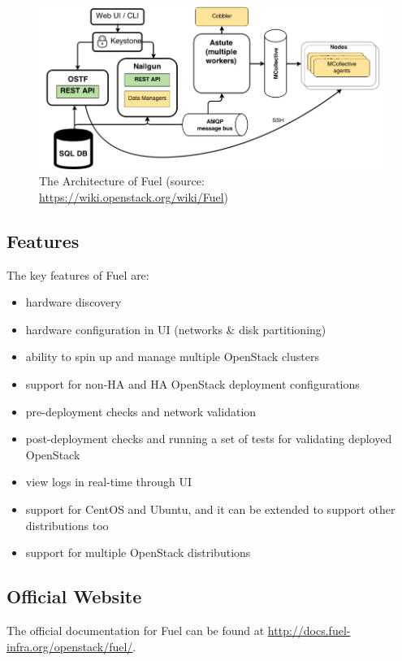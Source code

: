 \documentclass[a4paper, 12pt]{article}
\begin{document}
\begin{figure}[H]
	\centering
	\includegraphics[width=\linewidth]{img/fuel_arch.png}
  	\caption{The Architecture of Fuel (source: \href{https://wiki.openstack.org/wiki/Fuel}{https://wiki.openstack.org/wiki/Fuel})}
	\label{fig:4-waycache}
\end{figure}


\subsection{Features}
The key features of Fuel are:
\begin{itemize}
\item
hardware discovery
\item
hardware configuration in UI (networks \& disk partitioning)
\item
ability to spin up and manage multiple OpenStack clusters
\item
support for non-HA and HA OpenStack deployment configurations
\item
pre-deployment checks and network validation
\item
post-deployment checks and running a set of tests for validating deployed OpenStack
\item
view logs in real-time through UI
\item
support for CentOS and Ubuntu, and it can be extended to support other distributions too
\item
support for multiple OpenStack distributions
\end{itemize}

\subsection{Official Website}
The official documentation for Fuel can be found at \href{http://docs.fuel-infra.org/openstack/fuel/}{http://docs.fuel-infra.org/openstack/fuel/}.
\end{document}
